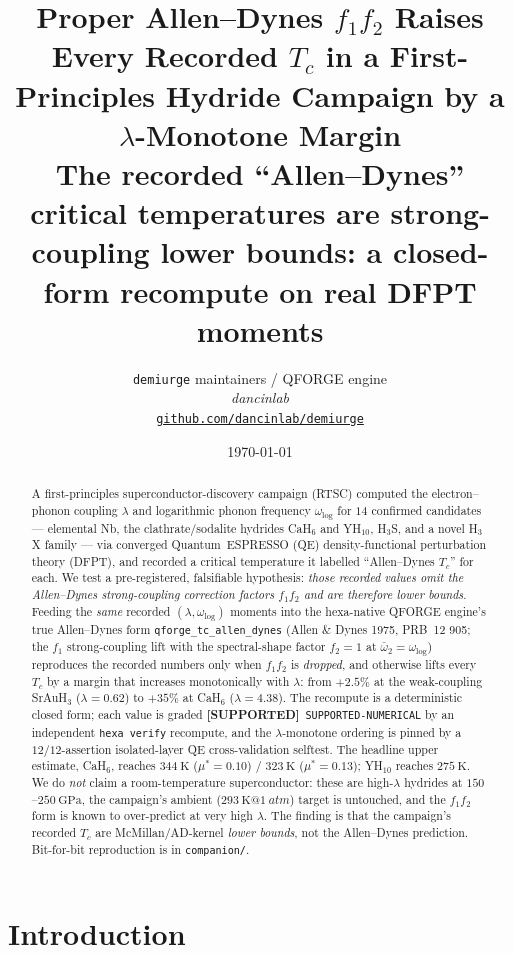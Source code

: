 \documentclass[11pt,a4paper]{article}
\title{
  \textbf{Proper Allen--Dynes $f_1 f_2$ Raises Every Recorded $T_c$ in a
  First-Principles Hydride Campaign by a $\lambda$-Monotone Margin}\\[4pt]
  \large The recorded ``Allen--Dynes'' critical temperatures are
  strong-coupling lower bounds: a closed-form recompute on real DFPT moments
}
\author{
  \texttt{demiurge} maintainers / QFORGE engine\\
  \normalsize\textit{dancinlab}\\[2pt]
  \normalsize\href{https://github.com/dancinlab/demiurge}{\texttt{github.com/dancinlab/demiurge}}
}
\date{\today}
\providecommand{\tierGreen}{\textcolor{green!50!black}{\textbf{[SUPPORTED]}}}
\begin{document}
\maketitle

\begin{abstract}
A first-principles superconductor-discovery campaign (RTSC) computed the
electron--phonon coupling $\lambda$ and logarithmic phonon frequency
$\omega_{\log}$ for $14$ confirmed candidates --- elemental Nb, the
clathrate/sodalite hydrides CaH$_6$ and YH$_{10}$, H$_3$S, and a novel H$_3$X
family --- via converged Quantum~ESPRESSO (QE) density-functional perturbation
theory (DFPT), and recorded a critical temperature it labelled ``Allen--Dynes
$T_c$'' for each. We test a pre-registered, falsifiable hypothesis: \emph{those
recorded values omit the Allen--Dynes strong-coupling correction factors
$f_1 f_2$ and are therefore lower bounds}. Feeding the \emph{same} recorded
$(\lambda,\omega_{\log})$ moments into the hexa-native QFORGE engine's true
Allen--Dynes form \texttt{qforge\_tc\_allen\_dynes} (Allen \& Dynes 1975,
PRB~12 905; the $f_1$ strong-coupling lift with the spectral-shape factor
$f_2{=}1$ at $\bar\omega_2{=}\omega_{\log}$) reproduces the recorded numbers
only when $f_1 f_2$ is \emph{dropped}, and otherwise lifts every $T_c$ by a
margin that increases monotonically with $\lambda$: from $+2.5\%$ at the
weak-coupling SrAuH$_3$ ($\lambda{=}0.62$) to $+35\%$ at CaH$_6$
($\lambda{=}4.38$). The recompute is a deterministic closed form; each value is
graded \tierGreen\ \texttt{SUPPORTED-NUMERICAL} by an independent
\texttt{hexa verify} recompute, and the $\lambda$-monotone ordering is pinned by
a $12/12$-assertion isolated-layer QE cross-validation selftest. The headline
upper estimate, CaH$_6$, reaches $\SI{344}{\kelvin}$ ($\mu^*{=}0.10$) /
$\SI{323}{\kelvin}$ ($\mu^*{=}0.13$); YH$_{10}$ reaches $\SI{275}{\kelvin}$.
We do \emph{not} claim a room-temperature superconductor: these are high-$\lambda$
hydrides at $150$--$\SI{250}{\giga\pascal}$, the campaign's ambient
($\SI{293}{\kelvin}@\SI{1}{atm}$) target is untouched, and the $f_1 f_2$ form is
known to over-predict at very high $\lambda$. The finding is that the campaign's
recorded $T_c$ are McMillan/AD-kernel \emph{lower bounds}, not the Allen--Dynes
prediction. Bit-for-bit reproduction is in \texttt{companion/}.
\end{abstract}

\section{Introduction}
\label{sec:intro}
\end{document}
